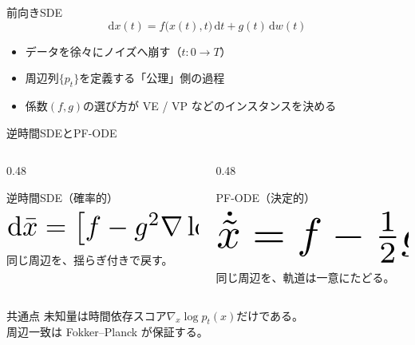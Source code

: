 \asmain
\begin{frame}{前向きSDE}
    \[
        \mathrm{d}x(t)
        =
        f\bigl(x(t),t\bigr)\,\mathrm{d}t
        + g(t)\,\mathrm{d}w(t)
        \tag{4.1.3}
    \]
    \begin{itemize}
        \item データを徐々にノイズへ崩す（$t:0\to T$）
        \item 周辺列$\{p_t\}$を定義する「公理」側の過程
        \item 係数$(f,g)$の選び方が VE / VP などのインスタンスを決める
    \end{itemize}
\end{frame}
\asmain
\begin{frame}{逆時間SDEとPF-ODE}
    \begin{columns}[T,onlytextwidth]
        \begin{column}{0.48\textwidth}
            \begin{block}{逆時間SDE（確率的）}
                \[
                    \resizebox{0.95\textwidth}{!}{$
                    \mathrm{d}\bar{x}
                    =
                    \bigl[f-g^{2}\nabla\log p_t\bigr]\mathrm{d}t
                    + g\,\mathrm{d}\bar{w}
                    $}
                \]
                同じ周辺を、揺らぎ付きで戻す。
            \end{block}
        \end{column}
        \begin{column}{0.48\textwidth}
            \begin{block}{PF-ODE（決定的）}
                \[
                    \resizebox{0.95\textwidth}{!}{$
                    \dot{\tilde{x}}
                    =
                    f-\tfrac12 g^{2}\nabla\log p_t
                    $}
                \]
                同じ周辺を、軌道は一意にたどる。
            \end{block}
        \end{column}
    \end{columns}
    \vfill
    \begin{block}{共通点}
        未知量は時間依存スコア$\nabla_x\log p_t(x)$だけである。\\
        周辺一致は Fokker--Planck が保証する。
    \end{block}
\end{frame}
\asmain
